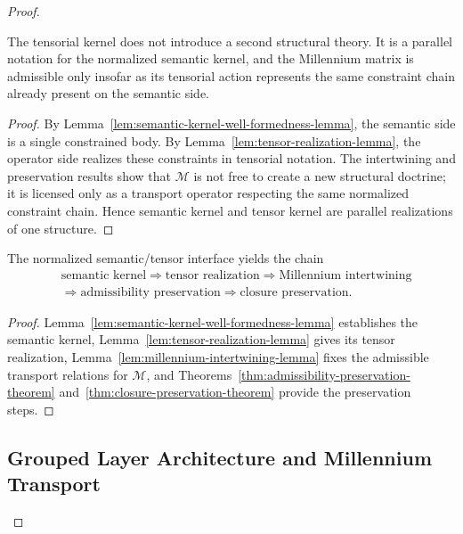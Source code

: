 \begin{proof}
\begin{proposition}
\label{prop:semantic-tensor-equivalence-proposition}
The tensorial kernel does not introduce a second structural theory. It is a
parallel notation for the normalized semantic kernel, and the Millennium matrix
is admissible only insofar as its tensorial action represents the same
constraint chain already present on the semantic side.
\end{proposition}

\begin{proof}
By Lemma~\ref{lem:semantic-kernel-well-formedness-lemma}, the semantic side is a
single constrained body. By Lemma~\ref{lem:tensor-realization-lemma}, the
operator side realizes these constraints in tensorial notation. The intertwining
and preservation results show that $\mathcal M$ is not free to create a new
structural doctrine; it is licensed only as a transport operator respecting the
same normalized constraint chain. Hence semantic kernel and tensor kernel are
parallel realizations of one structure.
\end{proof}

\begin{corollary}
\label{cor:first-semantic-tensor-forcing-chain}
The normalized semantic/tensor interface yields the chain
\[
\begin{aligned}
&\text{semantic kernel} \Longrightarrow \text{tensor realization} \Longrightarrow \text{Millennium intertwining}\\
&\Longrightarrow \text{admissibility preservation} \Longrightarrow \text{closure preservation}.
\end{aligned}
\]
\end{corollary}

\begin{proof}
Lemma~\ref{lem:semantic-kernel-well-formedness-lemma} establishes the semantic
kernel, Lemma~\ref{lem:tensor-realization-lemma} gives its tensor realization,
Lemma~\ref{lem:millennium-intertwining-lemma} fixes the admissible transport
relations for $\mathcal M$, and Theorems~\ref{thm:admissibility-preservation-theorem}
and~\ref{thm:closure-preservation-theorem} provide the preservation steps.
\end{proof}


\subsection*{Grouped Layer Architecture and Millennium Transport}


\end{proof}
